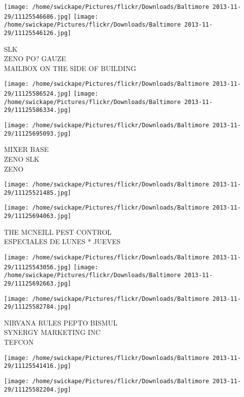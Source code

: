 \documentclass[10pt,letterpaper]{article}
\begin{document}
\vspace{0.25in}
\texttt{[image: /home/swickape/Pictures/flickr/Downloads/Baltimore 2013-11-29/11125546686.jpg]}
\texttt{[image: /home/swickape/Pictures/flickr/Downloads/Baltimore 2013-11-29/11125546126.jpg]}

SLK\\
ZENO PO? GAUZE\\
MAILBOX ON THE SIDE OF BUILDING
\pagebreak

\texttt{[image: /home/swickape/Pictures/flickr/Downloads/Baltimore 2013-11-29/11125586524.jpg]}
\texttt{[image: /home/swickape/Pictures/flickr/Downloads/Baltimore 2013-11-29/11125586334.jpg]}

\texttt{[image: /home/swickape/Pictures/flickr/Downloads/Baltimore 2013-11-29/11125695093.jpg]}

MIXER BASE\\
ZENO SLK\\
ZENO
\pagebreak

\texttt{[image: /home/swickape/Pictures/flickr/Downloads/Baltimore 2013-11-29/11125521485.jpg]}

\vspace{0.25in}
\texttt{[image: /home/swickape/Pictures/flickr/Downloads/Baltimore 2013-11-29/11125694063.jpg]}

THE MCNEILL PEST CONTROL\\
ESPECIALES DE LUNES * JUEVES
\pagebreak

\texttt{[image: /home/swickape/Pictures/flickr/Downloads/Baltimore 2013-11-29/11125543056.jpg]}
\texttt{[image: /home/swickape/Pictures/flickr/Downloads/Baltimore 2013-11-29/11125692663.jpg]}

\vspace{0.25in}
\texttt{[image: /home/swickape/Pictures/flickr/Downloads/Baltimore 2013-11-29/11125582784.jpg]}

NIRVANA RULES PEPTO BISMUL\\
SYNERGY MARKETING INC\\
TEFCON
\pagebreak

\texttt{[image: /home/swickape/Pictures/flickr/Downloads/Baltimore 2013-11-29/11125541416.jpg]}

\vspace{0.25in}
\texttt{[image: /home/swickape/Pictures/flickr/Downloads/Baltimore 2013-11-29/11125582204.jpg]}
\end{document}
